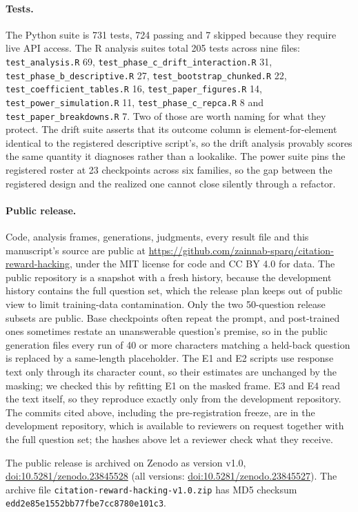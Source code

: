 \paragraph{Tests.}
The Python suite is 731 tests, 724 passing and 7 skipped because they require
live API access. The R analysis suites total 205 tests across nine files:
\texttt{test\_analysis.R} 69, \texttt{test\_phase\_c\_drift\_interaction.R} 31,
\texttt{test\_phase\_b\_descriptive.R} 27, \texttt{test\_bootstrap\_chunked.R}
22, \texttt{test\_coefficient\_tables.R} 16, \texttt{test\_paper\_figures.R}
14, \texttt{test\_power\_simulation.R} 11, \texttt{test\_phase\_c\_repca.R} 8
and \texttt{test\_paper\_breakdowns.R} 7. Two of those are worth naming for what
they protect. The drift suite asserts that its outcome column is
element-for-element identical to the registered descriptive script's, so the
drift analysis provably scores the same quantity it diagnoses rather than a
lookalike. The power suite pins the registered roster at 23 checkpoints across
six families, so the gap between the registered design and the realized one
cannot close silently through a refactor.

\paragraph{Public release.}
Code, analysis frames, generations, judgments, every result file and this
manuscript's source are public at
\url{https://github.com/zainnab-sparq/citation-reward-hacking}, under the MIT
license for code and CC BY 4.0 for data. The public repository is a snapshot with
a fresh history, because the development history contains the full question
set, which the release plan keeps out of public view to limit training-data
contamination. Only the two 50-question release subsets are public. Base
checkpoints often repeat the prompt, and post-trained ones sometimes restate an
unanswerable question's premise, so in the public generation files every run of
40 or more characters matching a held-back question is replaced by a
same-length placeholder. The E1 and E2 scripts use response text only through
its character count, so their estimates are unchanged by the masking; we checked
this by refitting E1 on the masked frame. E3 and E4 read the text itself, so
they reproduce exactly only from the development repository. The commits
cited above, including the pre-registration freeze, are in the development
repository, which is available to reviewers on request together with the full
question set; the hashes above let a reviewer check what they receive.

The public release is archived on Zenodo as version v1.0,
\href{https://doi.org/10.5281/zenodo.23845528}{doi:10.5281/zenodo.23845528}
(all versions:
\href{https://doi.org/10.5281/zenodo.23845527}{doi:10.5281/zenodo.23845527}).
The archive file \texttt{citation-reward-hacking-v1.0.zip} has MD5 checksum
\texttt{edd2e85e1552bb77fbe7cc8780e101c3}.
